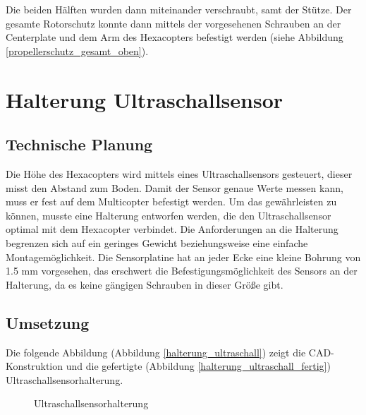 Die beiden Hälften wurden dann miteinander verschraubt, samt der Stütze.
Der gesamte Rotorschutz konnte dann mittels der vorgesehenen Schrauben an der Centerplate und dem Arm des Hexacopters befestigt werden (siehe Abbildung \ref{propellerschutz_gesamt_oben}).

			\newpage

\section{Halterung Ultraschallsensor}

	\subsection{Technische Planung}

	Die Höhe des Hexacopters wird mittels eines Ultraschallsensors gesteuert, dieser misst den Abstand zum Boden.
	Damit der Sensor genaue Werte messen kann, muss er fest auf dem Multicopter befestigt werden.
	Um das gewährleisten zu können, musste eine Halterung entworfen werden, die den Ultraschallsensor optimal mit dem Hexacopter verbindet.
	Die Anforderungen an die Halterung begrenzen sich auf ein geringes Gewicht beziehungsweise eine einfache Montagemöglichkeit.
	Die Sensorplatine hat an jeder Ecke eine kleine Bohrung von 1.5 mm vorgesehen, das erschwert die Befestigungsmöglichkeit des Sensors an der Halterung, da es keine gängigen Schrauben in dieser Größe gibt.

	\subsection{Umsetzung}

	Die folgende Abbildung (Abbildung \ref{halterung_ultraschall}) zeigt die CAD-Konstruktion und die gefertigte (Abbildung \ref{halterung_ultraschall_fertig}) Ultraschallsensorhalterung.

			\begin{figure}[H]
				\begin{centering}
				\par\end{centering}
				\caption{Ultraschallsensorhalterung}
				\label{Halterung_Ultraschallsensor}
			\end{figure}

